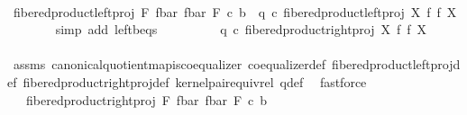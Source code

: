 \begin{isabellebody}
\ \ \isamarkupfalse%
\ {\isacharminus}{\kern0pt}\ \isanewline
\ \ \ \ \isamarkupfalse%
\ {\isachardoublequoteopen}{\isacharparenleft}{\kern0pt}fibered{\isacharunderscore}{\kern0pt}product{\isacharunderscore}{\kern0pt}left{\isacharunderscore}{\kern0pt}proj\ F\ {\isacharparenleft}{\kern0pt}f{\isacharunderscore}{\kern0pt}bar{\isacharparenright}{\kern0pt}\ {\isacharparenleft}{\kern0pt}f{\isacharunderscore}{\kern0pt}bar{\isacharparenright}{\kern0pt}\ F{\isacharparenright}{\kern0pt}\ {\isasymcirc}\isactrlsub c\ b\ {\isacharequal}{\kern0pt}\ q\ {\isasymcirc}\isactrlsub c\ fibered{\isacharunderscore}{\kern0pt}product{\isacharunderscore}{\kern0pt}left{\isacharunderscore}{\kern0pt}proj\ X\ f\ f\ X{\isachardoublequoteclose}\isanewline
\ \ \ \ \ \ \isamarkupfalse%
\ {\isacharparenleft}{\kern0pt}simp\ add{\isacharcolon}{\kern0pt}\ left{\isacharunderscore}{\kern0pt}b{\isacharunderscore}{\kern0pt}eqs{\isacharparenright}{\kern0pt}\isanewline
\ \ \ \ \isamarkupfalse%
\ \isamarkupfalse%
\ {\isachardoublequoteopen}{\isachardot}{\kern0pt}{\isachardot}{\kern0pt}{\isachardot}{\kern0pt}\ {\isacharequal}{\kern0pt}\ q\ {\isasymcirc}\isactrlsub c\ fibered{\isacharunderscore}{\kern0pt}product{\isacharunderscore}{\kern0pt}right{\isacharunderscore}{\kern0pt}proj\ X\ f\ f\ X{\isachardoublequoteclose}\isanewline
\ \ \ \ \ \ \isamarkupfalse%
\ assms{\isacharparenleft}{\kern0pt}{}{\isacharparenright}{\kern0pt}\ canonical{\isacharunderscore}{\kern0pt}quotient{\isacharunderscore}{\kern0pt}map{\isacharunderscore}{\kern0pt}is{\isacharunderscore}{\kern0pt}coequalizer\ coequalizer{\isacharunderscore}{\kern0pt}def\ fibered{\isacharunderscore}{\kern0pt}product{\isacharunderscore}{\kern0pt}left{\isacharunderscore}{\kern0pt}proj{\isacharunderscore}{\kern0pt}def\ fibered{\isacharunderscore}{\kern0pt}product{\isacharunderscore}{\kern0pt}right{\isacharunderscore}{\kern0pt}proj{\isacharunderscore}{\kern0pt}def\ kernel{\isacharunderscore}{\kern0pt}pair{\isacharunderscore}{\kern0pt}equiv{\isacharunderscore}{\kern0pt}rel\ q{\isacharunderscore}{\kern0pt}def\ \isamarkupfalse%
\ fastforce\isanewline
\ \ \ \ \isamarkupfalse%
\ \isamarkupfalse%
\ {\isachardoublequoteopen}{\isachardot}{\kern0pt}{\isachardot}{\kern0pt}{\isachardot}{\kern0pt}\ {\isacharequal}{\kern0pt}\ fibered{\isacharunderscore}{\kern0pt}product{\isacharunderscore}{\kern0pt}right{\isacharunderscore}{\kern0pt}proj\ F\ {\isacharparenleft}{\kern0pt}f{\isacharunderscore}{\kern0pt}bar{\isacharparenright}{\kern0pt}\ {\isacharparenleft}{\kern0pt}f{\isacharunderscore}{\kern0pt}bar{\isacharparenright}{\kern0pt}\ F\ {\isasymcirc}\isactrlsub c\ b{\isachardoublequoteclose}\isanewline

\end{isabellebody}
